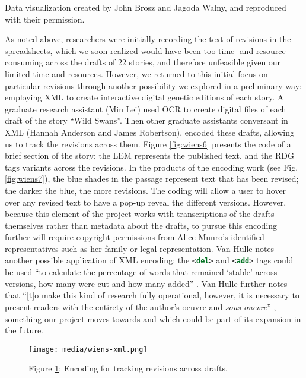 \documentclass{article}
\begin{document}
Data visualization created by John Brosz and Jagoda Walny, and reproduced with their permission.

As noted above, researchers were initially recording the text of
revisions in the spreadsheets, which we soon realized would have been
too time- and resource-consuming across the drafts of 22 stories, and
therefore unfeasible given our limited time and resources. However, we
returned to this initial focus on particular revisions through another
possibility we explored in a preliminary way: employing XML to create
interactive digital genetic editions of each story. A graduate research
assistant (Min Lei) used OCR to create digital files of each draft of
the story ``Wild Swans''. Then other graduate assistants conversant in
XML (Hannah Anderson and James Robertson), encoded these drafts,
allowing us to track the revisions across them. Figure \ref{fig:wiens6} presents the
code of a brief section of the story; the LEM represents the published
text, and the RDG tags variants across the revisions. In the products of
the encoding work (see Fig. \ref{fig:wiens7}), the blue shades in the passage represent
text that has been revised; the darker the blue, the more revisions. The
coding will allow a user to hover over any revised text to have a pop-up
reveal the different versions. However, because this element of the
project works with transcriptions of the drafts themselves rather than
metadata about the drafts, to pursue this encoding further will require
copyright permissions from Alice Munro’s identified representatives
such as her family or legal representation. Van Hulle notes another
possible application of XML encoding: the \lstinline[language=XML]!<del>!
and \lstinline[language=XML]!<add>! tags could be used ``to calculate the
percentage of words that remained `stable' across versions, how many
were cut and how many added'' \citep[174]{van_hulle_genetic_2022}. Van Hulle further notes
that ``{[}t{]}o make this kind of research fully operational, however,
it is necessary to present readers with the entirety of the author's
oeuvre and \emph{sous-ouevre}'' \citep[174]{van_hulle_genetic_2022}, something our project moves
towards and which could be part of its expansion in the future.


\begin{figure}
    \centering
    \texttt{[image: media/wiens-xml.png]}
    \caption{Figure \ref{fig:wiens-6}: Encoding for tracking revisions across drafts.}
    \label{fig:wiens-6}
\end{figure}
\end{document}

